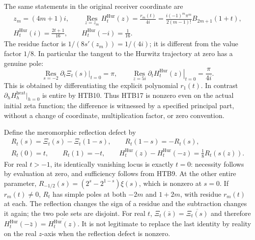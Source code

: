 \documentclass[11pt]{article}
\theoremstyle{definition}
\begin{document}
The same statements in the original receiver coordinate are
\begin{equation}\tag{HTB20}
\begin{gathered}
 z_m=(4m+1)i,\qquad
 \operatorname*{Res}_{z=z_m}H_t^{\mathrm{Hur}}(z)
 =\frac{r_m(t)}{4i}
 =\frac{i(-1)^m\pi^m}{2(m-1)!}B_{2m+1}(1+t),\\
 H_t^{\mathrm{Hur}}(i)=\frac{2t+1}{16},\qquad
 H_t^{\mathrm{Hur}}(-i)=\frac1{16}.
\end{gathered}
\end{equation}
The residue factor is $1/(8s'(z_m))=1/(4i)$; it is different from
the value factor $1/8$. In particular the tangent to the Hurwitz
trajectory at zero has a genuine pole:
\begin{equation}\tag{HTB21}
 \operatorname*{Res}_{s=-2}\left.\partial_t\Xi_t(s)\right|_{t=0}
 =\pi,\qquad
 \operatorname*{Res}_{z=5i}\left.\partial_tH_t^{\mathrm{Hur}}(z)
                                      \right|_{t=0}=\frac{\pi}{4i}.
\end{equation}
This is obtained by differentiating the explicit polynomial $r_1(t)$.
In contrast $\partial_h H_h^{\mathrm{heat}}|_{h=0}$ is entire by
HTB10. Thus HTB17 is nonzero even on the actual initial zeta function;
the difference is witnessed by a specified principal part, without a
change of coordinate, multiplication factor, or zero convention.

Define the meromorphic reflection defect by
\begin{equation}\tag{HTB22}
\begin{gathered}
 R_t(s)=\Xi_t(s)-\Xi_t(1-s),\qquad R_t(1-s)=-R_t(s),\\
 R_t(0)=t,\qquad R_t(1)=-t,\qquad
 H_t^{\mathrm{Hur}}(z)-H_t^{\mathrm{Hur}}(-z)=\frac18R_t(s(z)).
\end{gathered}
\end{equation}
For real $t>-1$, its identically vanishing locus is exactly $t=0$:
necessity follows by evaluation at zero, and sufficiency follows from
HTB9. At the other entire parameter,
$R_{-1/2}(s)=(2^s-2^{1-s})\xi(s)$, which is nonzero at $s=0$.
If $r_m(t)\ne0$, $R_t$ has simple poles at both $-2m$ and $1+2m$,
with residue $r_m(t)$ at each. The reflection changes the sign of a
residue and the subtraction changes it again; the two pole sets are
disjoint. For real $t$, $\Xi_t(\bar s)=\overline{\Xi_t(s)}$ and
therefore
$H_t^{\mathrm{Hur}}(-\bar z)=\overline{H_t^{\mathrm{Hur}}(z)}$.
It is not legitimate to replace the last identity by reality on the
real $z$-axis when the reflection defect is nonzero.
\end{document}
